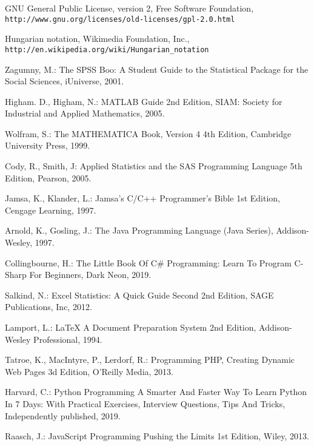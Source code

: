\documentclass[runningheads,14pt,a4paper,openany]{book}
\begin{document}
\newpage
\begin{thebibliography}{99}

 GNU General Public License, version 2, Free Software Foundation, \\\texttt{http://www.gnu.org/licenses/old-licenses/gpl-2.0.html}

 Hungarian notation, Wikimedia Foundation, Inc., \\\texttt{http://en.wikipedia.org/wiki/Hungarian\_notation}

 Zagumny, M.: The SPSS Boo: A Student Guide to the Statistical Package for the Social Sciences, iUniverse, 2001.

 Higham. D., Higham, N.: MATLAB Guide 2nd Edition, SIAM: Society for Industrial and Applied Mathematics, 2005.

 Wolfram, S.: The MATHEMATICA Book, Version 4 4th Edition, Cambridge University Press, 1999.

 Cody, R., Smith, J: Applied Statistics and the SAS Programming Language 5th Edition, Pearson, 2005.

 Jamsa, K., Klander, L.: Jamsa's C/C++ Programmer's Bible 1st Edition, Cengage Learning, 1997.

 Arnold, K.,  Gosling, J.: The Java Programming Language (Java Series), Addison-Wesley, 1997.

 Collingbourne, H.: The Little Book Of C\# Programming: Learn To Program C-Sharp For Beginners, Dark Neon, 2019.

 Salkind, N.: Excel Statistics: A Quick Guide Second 2nd Edition, SAGE Publications, Inc, 2012.

 Lamport, L.: LaTeX A Document Preparation System 2nd Edition, Addison-Wesley Professional, 1994.

 Tatroe, K., MacIntyre, P., Lerdorf, R.: Programming PHP, Creating Dynamic Web Pages 3d Edition, O'Reilly Media, 2013.

 Harvard, C.: Python Programming A Smarter And Faster Way To Learn Python In 7 Days: With Practical Exercises, Interview Questions, Tips And Tricks, Independently published, 2019.

 Raasch, J.: JavaScript Programming Pushing the Limits 1st Edition, Wiley, 2013.


\end{thebibliography}
\end{document}
